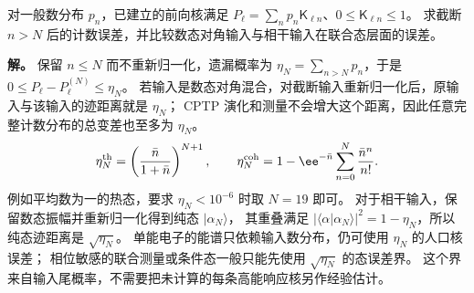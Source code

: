 \begin{exbox}[光子数尾部怎样控制电子计数核]
对一般数分布 $p_n$，已建立的前向核满足
$P_\ell=\sum_np_n\mathsf K_{\ell n}$、$0\le\mathsf K_{\ell n}\le1$。
求截断 $n>N$ 后的计数误差，并比较数态对角输入与相干输入在联合态层面的误差。

\textbf{解。} 保留 $n\le N$ 而不重新归一化，遗漏概率为 $\eta_N=\sum_{n>N}p_n$，于是
$0\le P_\ell-P_\ell^{(N)}\le\eta_N$。
若输入是数态对角混合，对截断输入重新归一化后，原输入与该输入的迹距离就是 $\eta_N$；
CPTP 演化和测量不会增大这个距离，因此任意完整计数分布的总变差也至多为 $\eta_N$。
\[
\eta_N^{\rm th}=\left(\frac{\bar n}{1+\bar n}\right)^{N+1},\qquad
\eta_N^{\rm coh}=1-\ee^{-\bar n}\sum_{n=0}^{N}\frac{\bar n^n}{n!}.
\]
例如平均数为一的热态，要求 $\eta_N<10^{-6}$ 时取 $N=19$ 即可。
对于相干输入，保留数态振幅并重新归一化得到纯态 $|\alpha_N\rangle$，
其重叠满足 $|\langle\alpha|\alpha_N\rangle|^2=1-\eta_N$，所以纯态迹距离是 $\sqrt{\eta_N}$。
单能电子的能谱只依赖输入数分布，仍可使用 $\eta_N$ 的人口核误差；
相位敏感的联合测量或条件态一般只能先使用 $\sqrt{\eta_N}$ 的态误差界。
这个界来自输入尾概率，不需要把未计算的每条高能响应核另作经验估计。
\end{exbox}
